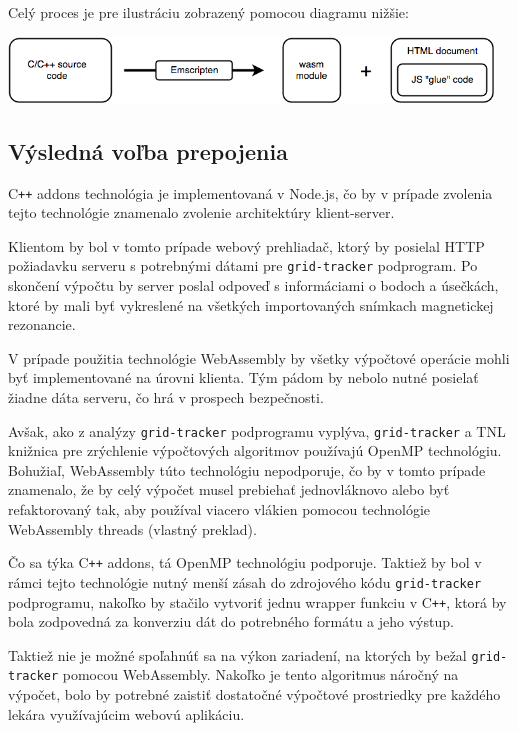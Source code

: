 Celý proces je pre ilustráciu zobrazený pomocou diagramu nižšie:
\begin {center}
        \centering
        \includegraphics[height=1.75cm]{media/graphs/cpp_to_wasm.png}
        \captionsetup{justification=centering}
\end {center}

\subsection {Výsledná voľba prepojenia}
C\texttt{++} addons technológia je implementovaná v Node.js, čo by v prípade zvolenia tejto technológie znamenalo zvolenie architektúry klient-server.

Klientom by bol v tomto prípade webový prehliadač, ktorý by posielal HTTP požiadavku serveru s potrebnými dátami pre \texttt{grid-tracker} podprogram. Po skončení výpočtu by server poslal odpoveď s informáciami o bodoch a úsečkách, ktoré by mali byť vykreslené na všetkých importovaných snímkach magnetickej rezonancie.

V prípade použitia technológie WebAssembly by všetky výpočtové operácie mohli byť implementované na úrovni klienta. Tým pádom by nebolo nutné posielať žiadne dáta serveru, čo hrá v prospech bezpečnosti.

Avšak, ako z analýzy \texttt{grid-tracker} podprogramu vyplýva, \texttt{grid-tracker} a TNL knižnica pre zrýchlenie výpočtových algoritmov používajú OpenMP technológiu. Bohužiaľ, WebAssembly túto technológiu nepodporuje, čo by v tomto prípade znamenalo, že by celý výpočet musel prebiehať jednovláknovo alebo byť refaktorovaný tak, aby používal viacero vlákien pomocou technológie WebAssembly threads \cite{webassembly_threads} (vlastný preklad).

Čo sa týka C\texttt{++} addons, tá OpenMP technológiu podporuje. Taktiež by bol v rámci tejto technológie nutný menší zásah do zdrojového kódu \texttt{grid-tracker} podprogramu, nakoľko by stačilo vytvoriť jednu wrapper funkciu v C\texttt{++}, ktorá by bola zodpovedná za konverziu dát do potrebného formátu a jeho výstup.

Taktiež nie je možné spoľahnúť sa na výkon zariadení, na ktorých by bežal \texttt{grid-tracker} pomocou WebAssembly. Nakoľko je tento algoritmus náročný na výpočet, bolo by potrebné zaistiť dostatočné výpočtové prostriedky pre každého lekára využívajúcim webovú aplikáciu.

